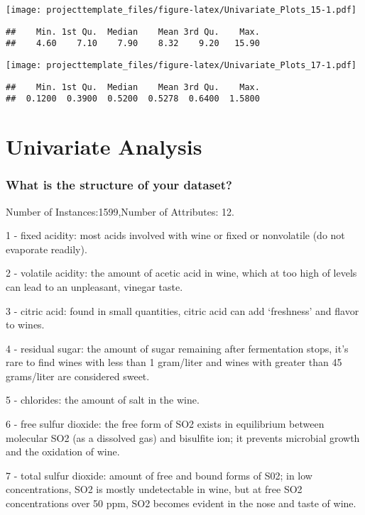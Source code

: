 \documentclass[]{article}
\begin{document}
\texttt{[image: projecttemplate\_files/figure-latex/Univariate\_Plots\_15-1.pdf]}

\begin{verbatim}
##    Min. 1st Qu.  Median    Mean 3rd Qu.    Max. 
##    4.60    7.10    7.90    8.32    9.20   15.90
\end{verbatim}

\texttt{[image: projecttemplate\_files/figure-latex/Univariate\_Plots\_17-1.pdf]}

\begin{verbatim}
##    Min. 1st Qu.  Median    Mean 3rd Qu.    Max. 
##  0.1200  0.3900  0.5200  0.5278  0.6400  1.5800
\end{verbatim}

\section{Univariate Analysis}\label{univariate-analysis}

\subsubsection{What is the structure of your
dataset?}\label{what-is-the-structure-of-your-dataset}

Number of Instances:1599,Number of Attributes: 12.

1 - fixed acidity: most acids involved with wine or fixed or nonvolatile
(do not evaporate readily).

2 - volatile acidity: the amount of acetic acid in wine, which at too
high of levels can lead to an unpleasant, vinegar taste.

3 - citric acid: found in small quantities, citric acid can add
`freshness' and flavor to wines.

4 - residual sugar: the amount of sugar remaining after fermentation
stops, it's rare to find wines with less than 1 gram/liter and wines
with greater than 45 grams/liter are considered sweet.

5 - chlorides: the amount of salt in the wine.

6 - free sulfur dioxide: the free form of SO2 exists in equilibrium
between molecular SO2 (as a dissolved gas) and bisulfite ion; it
prevents microbial growth and the oxidation of wine.

7 - total sulfur dioxide: amount of free and bound forms of S02; in low
concentrations, SO2 is mostly undetectable in wine, but at free SO2
concentrations over 50 ppm, SO2 becomes evident in the nose and taste of
wine.
\end{document}
